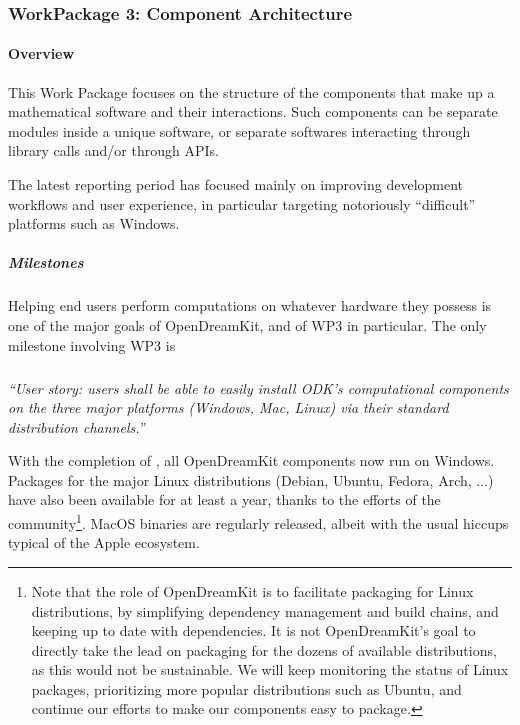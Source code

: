 \subsubsection{WorkPackage 3:  Component Architecture}

\paragraph{Overview}

This Work Package focuses on the structure of the components that make
up a mathematical software and their interactions. Such components can
be separate modules inside a unique software, or separate softwares
interacting through library calls and/or through APIs.

The latest reporting period has focused mainly on improving
development workflows and user experience, in particular targeting
notoriously ``difficult'' platforms such as Windows.

\subparagraph{Milestones} Helping end users perform computations on
whatever hardware they possess is one of the major goals of
OpenDreamKit, and of WP3 in particular. The only milestone involving
WP3 is

\subparagraph{}

\emph{“User story: users shall be able to easily install ODK's
    computational components on the three major platforms (Windows,
    Mac, Linux) via their standard distribution channels.”}

  With the completion of
  , all
  OpenDreamKit components now run on Windows. Packages for the major
  Linux distributions (Debian, Ubuntu, Fedora, Arch, ...) have also
  been available for at least a year, thanks to the efforts of the
  community\footnote{Note that the role of OpenDreamKit is to
    facilitate packaging for Linux distributions, by simplifying
    dependency management and build chains, and keeping up to date
    with dependencies. It is not OpenDreamKit's goal to directly take
    the lead on packaging for the dozens of available distributions,
    as this would not be sustainable. We will keep monitoring the
    status of Linux packages, prioritizing more popular distributions
    such as Ubuntu, and continue our efforts to make our components
    easy to package.}. MacOS binaries are regularly released, albeit
  with the usual hiccups typical of the Apple ecosystem.

